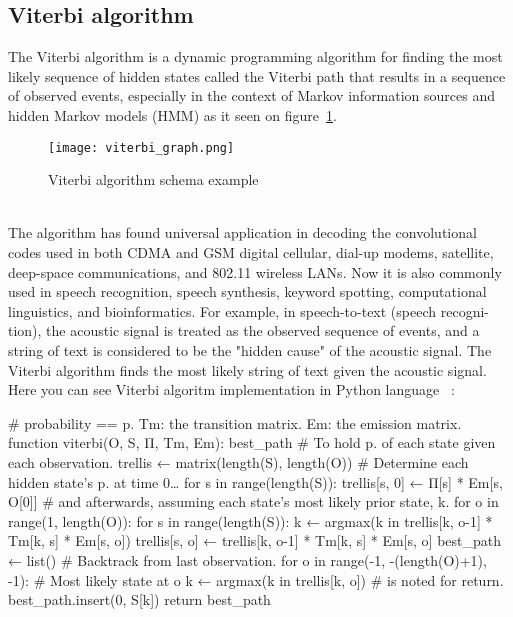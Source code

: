 \subsection{Viterbi algorithm} \label{subsec:viterbi}
The Viterbi algorithm is a dynamic programming algorithm for finding the most likely sequence of hidden states called
the Viterbi path that results in a sequence of observed events, especially in the context of Markov information
sources and hidden Markov models (HMM) as it seen on figure~\ref{viterbi-schema}.
\begin{figure}[h!]
	\begin{center}
		\texttt{[image: viterbi\_graph.png]}
	\end{center}
	\caption{Viterbi algorithm schema example~\cite{viterbi}}
	\label{viterbi-schema}
\end{figure}\\
The algorithm has found universal application in decoding the convolutional codes used in both CDMA and GSM digital cellular,
dial-up modems, satellite, deep-space communications, and 802.11 wireless LANs.
Now it is also commonly used in speech recognition, speech synthesis, keyword spotting, computational linguistics, and bioinformatics.
For example, in speech-to-text (speech recogni- tion), the acoustic signal is treated as the observed sequence of events, and a string of text is considered
to be the "hidden cause" of the acoustic signal. The Viterbi algorithm finds the most likely string of text given the acoustic signal.\\
Here you can see Viterbi algoritm implementation in Python language ~\cite{DBLP:journals/corr/abs-cs-0504020}: \\
\begin{python}
# probability == p. Tm: the transition matrix. Em: the emission matrix.
function viterbi(O, S, Π, Tm, Em): best_path
  # To hold p. of each state given each observation.
  trellis ← matrix(length(S), length(O))
  # Determine each hidden state's p. at time 0…
  for s in range(length(S)):
    trellis[s, 0] ← Π[s] * Em[s, O[0]]
  # and afterwards, assuming each state's most likely prior state, k.
  for o in range(1, length(O)):
    for s in range(length(S)):
      k ← argmax(k in trellis[k, o-1] * Tm[k, s] * Em[s, o])
      trellis[s, o] ← trellis[k, o-1] * Tm[k, s] * Em[s, o]
  best_path ← list()
  # Backtrack from last observation.
  for o in range(-1, -(length(O)+1), -1):
    # Most likely state at o
    k ← argmax(k in trellis[k, o])
    # is noted for return.
    best_path.insert(0, S[k])
  return best_path
\end{python}\\

